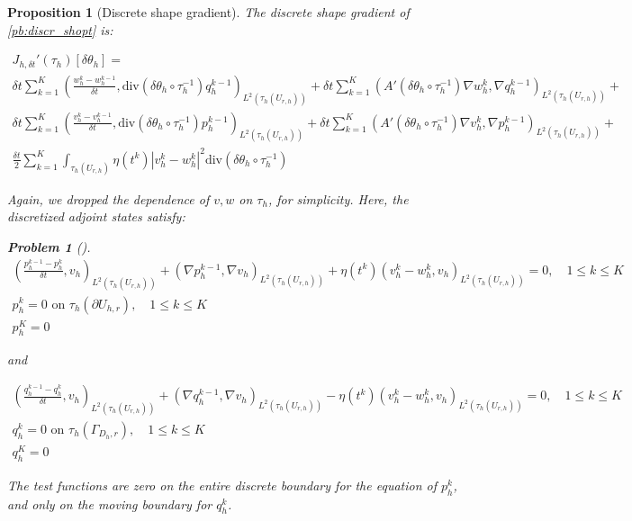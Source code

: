 \documentclass[english,a4paper,9pt,oneside]{scrbook}	%
\theoremstyle{break}
\newtheorem{prop}[equation]{Proposition}
\newtheorem{pb}[equation]{Problem}
\theoremstyle{remark}
\newcommand{\dive}{\text{div}}
\begin{document}
\begin{prop}[Discrete shape gradient]
\label{prop:discrete_shape_gradient}
The discrete shape gradient of \cref{pb:discr_shopt} is:

\begin{align*}
	J_{h,\delta t}'(\tau_h)[\delta \theta_h] =\\
	\delta t \sum_{k=1}^{K} \left (\frac{w_h^{k}-w_h^{k-1}}{\delta t}, \dive(\delta \theta_h \circ \tau_h^{-1}) q_h^{k-1} \right )_{L^2(\tau_h(U_{r,h}))} + \delta t \sum_{k=1}^{K} (A'(\delta \theta_h \circ \tau_h^{-1}) \nabla w_h^k, \nabla q_h^{k-1})_{L^2(\tau_h(U_{r,h}))}+\\
	\delta t \sum_{k=1}^{K} \left (\frac{v_h^{k}-v_h^{k-1}}{\delta t}, \dive(\delta \theta_h \circ \tau_h^{-1}) p_h^{k-1} \right )_{L^2(\tau_h(U_{r,h}))} + \delta t \sum_{k=1}^{K} (A'(\delta \theta_h \circ \tau_h^{-1}) \nabla v_h^k, \nabla p_h^{k-1})_{L^2(\tau_h(U_{r,h}))}+\\
	\frac{\delta t}{2} \sum_{k=1}^{K} \int_{\tau_h(U_{r,h})} \eta(t^k)|v_h^k-w_h^k|^2  \dive(\delta \theta_h \circ \tau_h^{-1})
\end{align*}

Again, we dropped the dependence of $v,w$ on $\tau_h$, for simplicity. Here, the discretized adjoint states satisfy:

\begin{pb}[]

\begin{align*}
	\left ( \frac{p_h^{k-1}-p_h^k}{\delta t}, v_h\right )_{L^2(\tau_h(U_{r,h}))} + (\nabla p_h^{k-1}, \nabla v_h )_{L^2(\tau_h(U_{r,h}))} + \eta(t^k)(v_h^k-w_h^k,v_h)_{L^2(\tau_h(U_{r,h}))} = 0, \quad 1\leq k \leq K\\
	p_h^k = 0 \text{ on }  \tau_h (\partial U_{h,r}), \quad 1\leq k \leq K\\
	p_h^K=0 
\end{align*}

and 

\begin{align*}
	\left ( \frac{q_h^{k-1}-q_h^k}{\delta t}, v_h\right )_{L^2(\tau_h(U_{r,h}))} + (\nabla q_h^{k-1}, \nabla v_h )_{L^2(\tau_h(U_{r,h}))} - \eta(t^k)(v_h^k-w_h^k,v_h)_{L^2(\tau_h(U_{r,h}))} = 0, \quad 1\leq k \leq K\\
	q_h^k = 0 \text{ on } \tau_h (\Gamma_{D_h,r}), \quad 1\leq k \leq K\\
	q_h^K=0 
\end{align*}

The test functions are zero on the entire discrete boundary for the equation of $p_{h}^k$, and only on the moving boundary for $q_h^k$.

\end{pb}

\end{prop}
\end{document}
